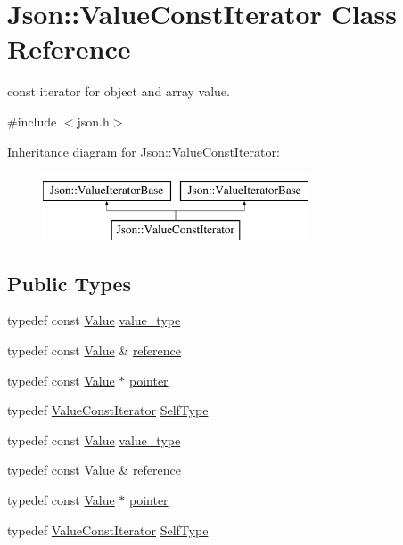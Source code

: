 \hypertarget{class_json_1_1_value_const_iterator}{}\section{Json\+:\+:Value\+Const\+Iterator Class Reference}
\label{class_json_1_1_value_const_iterator}


const iterator for object and array value.  




{\ttfamily \#include $<$json.\+h$>$}

Inheritance diagram for Json\+:\+:Value\+Const\+Iterator\+:\begin{figure}[H]
\begin{center}
\leavevmode
\includegraphics[height=2.000000cm]{class_json_1_1_value_const_iterator}
\end{center}
\end{figure}
\subsection*{Public Types}
\begin{DoxyCompactItemize}
\item 
typedef const \hyperlink{class_json_1_1_value}{Value} \hyperlink{class_json_1_1_value_const_iterator_aa5f1707dcef4bfe73e23ddc14dbe760d}{value\+\_\+type}
\item 
typedef const \hyperlink{class_json_1_1_value}{Value} \& \hyperlink{class_json_1_1_value_const_iterator_aa9b05c6a37cd352ea1ee6e13b816f709}{reference}
\item 
typedef const \hyperlink{class_json_1_1_value}{Value} $\ast$ \hyperlink{class_json_1_1_value_const_iterator_a400136bd8bc09e9fddec0785fa2cff14}{pointer}
\item 
typedef \hyperlink{class_json_1_1_value_const_iterator}{Value\+Const\+Iterator} \hyperlink{class_json_1_1_value_const_iterator_a0c2e33e7eb5a80dd8709fb28ece83933}{Self\+Type}
\item 
typedef const \hyperlink{class_json_1_1_value}{Value} \hyperlink{class_json_1_1_value_const_iterator_aa5f1707dcef4bfe73e23ddc14dbe760d}{value\+\_\+type}
\item 
typedef const \hyperlink{class_json_1_1_value}{Value} \& \hyperlink{class_json_1_1_value_const_iterator_aa9b05c6a37cd352ea1ee6e13b816f709}{reference}
\item 
typedef const \hyperlink{class_json_1_1_value}{Value} $\ast$ \hyperlink{class_json_1_1_value_const_iterator_a400136bd8bc09e9fddec0785fa2cff14}{pointer}
\item 
typedef \hyperlink{class_json_1_1_value_const_iterator}{Value\+Const\+Iterator} \hyperlink{class_json_1_1_value_const_iterator_a0c2e33e7eb5a80dd8709fb28ece83933}{Self\+Type}
\end{DoxyCompactItemize}

